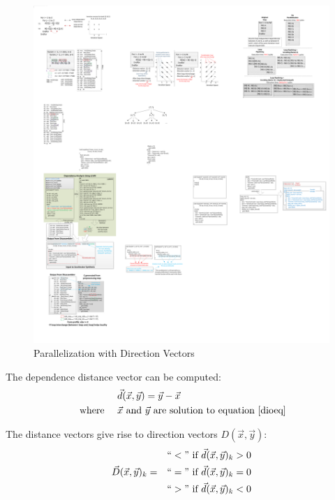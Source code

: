 \begin{figure}[htp]
\begin{center}
\includegraphics[width=1.0\linewidth]{chap6fig/paral.pdf}
\caption{Parallelization with Direction Vectors
\label{fig:paral}}
\end{center}
\end{figure}
The dependence distance vector can be computed:
\begin{equation*}
\begin{aligned}
&  & & \vec{d}(\vec{x},\vec{y}) = \vec{y}-\vec{x} \\
& \text{ where }&   & \vec{x} \text{ and }\vec{y} \text{ are solution to equation~\ref{dioeq}}  
\end{aligned}
\end{equation*}

The distance vectors give rise to direction vectors $D(\vec{x},\vec{y})$:
\begin{equation*}
\begin{aligned}
  & & ``<" \text{ if } \vec{d}(\vec{x},\vec{y})_k>0 \\
 \vec{D}(\vec{x},\vec{y})_k = &   & ``=" \text{ if } \vec{d}(\vec{x},\vec{y})_k=0\\
 & & ``>" \text{ if } \vec{d}(\vec{x},\vec{y})_k<0
\end{aligned}
\end{equation*}


